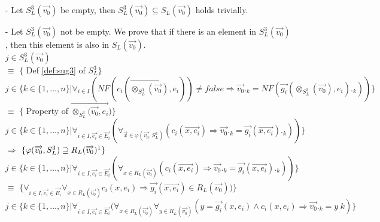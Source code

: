\index{}\documentclass[a4paper,10pt]{article}
\theoremstyle{plain}
\theoremstyle{definition}
\newcommand{\ovr}{\overrightarrow}
\begin{document}
\begin{itemize}
\newcommand{\tmp}{\vspace{8pt}}

\item[-] Let $S_L^3(\ovr{v_0})$ be empty, then $S_L^3(\ovr{v_0}) \subseteq S_L(\ovr{v_0})$ holds trivially.
\item[-] Let $S_L^3(\ovr{v_0})$ not be empty. We prove that if there is an element in $S_L^3(\ovr{v_0})$, then this element is also in $S_L(\ovr{v_0})$. \\ \tmp
\tmp $ j \in S_L^3(\ovr{v_0})$ \\ 
\tmp $ \equiv $ \hspace{20pt} $\lbrace$ Def \ref{def:sug3} of $S_L^3 \rbrace$ \\ 
\tmp $ j \in \lbrace k \in \lbrace 1, \ldots, n \rbrace \vert \forall_{i \in I}(NF(c_i(\ovr{\otimes_{S_L^3}(\ovr{v_0}), e_i})) \neq false \Rightarrow \ovr{v_0}._k = NF(\ovr{g_i}(\otimes_{S_L^3}(\ovr{v_0}), e_i)._k) ) \rbrace$ \\
\tmp $ \equiv $ \hspace{20pt} $\lbrace$ Property of $\ovr{\otimes_{S_L^3}(\ovr{v_0},e_i})\rbrace$ \\ 
\tmp $ j \in \lbrace k \in \lbrace 1, \ldots, n \rbrace \vert \forall_{i \in I, \ovr{e_i} \in \ovr{E_i}}(\forall_{\ovr{x} \in
 \varphi(\ovr{v_0},S_L^3)
}(c_i(\ovr{x, e_i}) \Rightarrow \ovr{v_0}._k = \ovr{g_i}(\ovr{x, e_i})._k )) \rbrace$\\
\tmp $ \Rightarrow$ \hspace{20pt} $\lbrace  \varphi(\ovr{v_0},S_L^3) \supseteq R_L(\ovr{v_0}) \footnote{See Example \ref{example:proof3}} \rbrace$  \\
\tmp $ j \in \lbrace k \in \lbrace 1, \ldots, n \rbrace \vert \forall_{i \in I, \ovr{e_i} \in \ovr{E_i}}(\forall_{x \in R_L(\ovr{v_0})}( c_i(\ovr{x, e_i})  \Rightarrow \ovr{v_0}._k = \ovr{g_i}(\ovr{x, e_i})._k )) \rbrace$\\
\tmp $ \equiv $ \hspace{20pt} $\lbrace \forall_{i \in I, \ovr{e_i} \in \ovr{E_i}} \forall_{x \in R_L(\ovr{v_0})} c_i(x,e_i) \Rightarrow \ovr{g_i}(\ovr{x, e_i}) \in R_L(\ovr{v_0}) ) \rbrace$\\
\tmp $j \in \lbrace k \in \lbrace 1, \ldots, n \rbrace \vert \forall_{i \in I, \ovr{e_i} \in \ovr{E_i}}(\forall_{x \in R_L(\ovr{v_0})} \forall_{y \in R_L(\ovr{v_0})} (y = \ovr{g_i}(x,e_i) \wedge c_i(x, e_i) \Rightarrow \ovr{v_0}._k = y_.k )  \rbrace $\\

\end{itemize}
\end{document}
